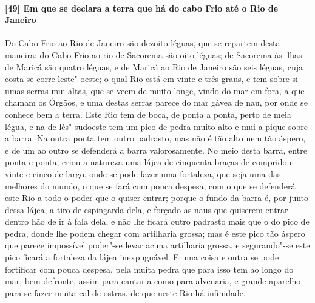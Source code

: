 \begin{linenumbers}
\paragraph{[49] Em que se declara a terra que há do cabo Frio até o Rio de Janeiro} \quad
Do Cabo Frio ao Rio de Janeiro são dezoito léguas, que se repartem desta maneira: do Cabo
Frio ao rio de Sacorema são oito léguas; de Sacorema às ilhas de Maricá são quatro léguas,
e de Maricá ao Rio de Janeiro são seis léguas, cuja costa se corre leste"-oeste; o qual Rio
está em vinte e três graus, e tem sobre si umas serras mui altas, que se veem de muito
longe, vindo do mar em fora, a que chamam os Órgãos, e uma destas serras parece do mar
gávea de nau, por onde se conhece bem a terra. Este Rio tem de boca, de ponta a ponta,
perto de meia légua, e na de lés"-sudoeste tem um pico de pedra muito alto e mui a pique
sobre a barra. Na outra ponta tem outro padrasto, mas não é tão alto nem tão áspero, e de
um ao outro se defenderá a barra valorosamente. No meio desta barra, entre ponta e ponta,
criou a natureza uma lájea de cinquenta braças de comprido e vinte e cinco de largo, onde
se pode fazer uma fortaleza, que seja uma das melhores do mundo, o que se fará com pouca
despesa, com o que se defenderá este Rio a todo o poder que o quiser entrar; porque o
fundo da barra é, por junto dessa lájea, a tiro de espingarda dela, e forçado as naus que
quiserem entrar dentro hão de ir à fala dela, e não lhe ficará outro padrasto mais que o
do pico de pedra, donde lhe podem chegar com artilharia grossa; mas é este pico tão áspero
que parece impossível poder"-se levar acima artilharia grossa, e segurando"-se este pico
ficará a fortaleza da lájea inexpugnável. E uma coisa e outra se pode fortificar com pouca
despesa, pela muita pedra que para isso tem ao longo do mar, bem defronte, assim para
cantaria como para alvenaria, e grande aparelho para se fazer muita cal de ostras, de que
neste Rio há infinidade.


\end{linenumbers}
